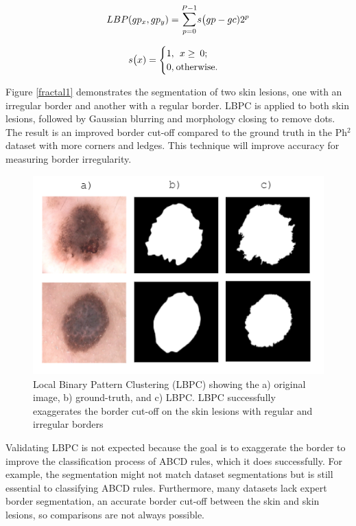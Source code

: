\begin{equation} \label{eq1}
LBP(gp_x, gp_y) = \mathlarger{\sum}_{p=0}^{P-1}s\big(gp - gc)2^p
\end{equation}

\begin{equation} \label{eq2}
s\big(x) = 
\begin{cases}
1,\:\:x\geq\:0; \\
0,\:$otherwise$.
\end{cases}
\end{equation}

Figure \ref{fractal1} demonstrates the segmentation of two skin lesions, one with an irregular border and another with a regular border. LBPC is applied to both skin lesions, followed by Gaussian blurring and morphology closing to remove dots. The result is an improved border cut-off compared to the ground truth in the Ph$^2$ dataset with more corners and ledges. This technique will improve accuracy for measuring border irregularity\cite{Pereira2020}.

\begin{figure}
\centering
\includegraphics[scale=1.2]{images/borders.PNG}
\caption{Local Binary Pattern Clustering (LBPC) showing the a) original image, b) ground-truth, and c) LBPC. LBPC successfully exaggerates the border cut-off on the skin lesions with regular and irregular borders} 
\end{figure}\label{fractal1}

Validating LBPC is not expected because the goal is to exaggerate the border to improve the classification process of ABCD rules, which it does successfully\cite{Pereira2020, Kaya2016}. For example, the segmentation might not match dataset segmentations but is still essential to classifying ABCD rules. Furthermore, many datasets lack expert border segmentation, an accurate border cut-off between the skin and skin lesions, so comparisons are not always possible.

